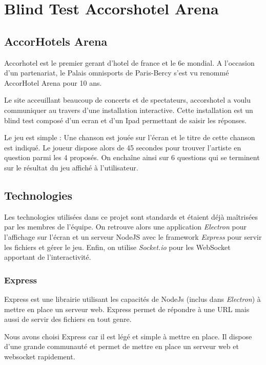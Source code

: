 \section{Blind Test Accorshotel Arena}

\subsection{AccorHotels Arena}

Accorhotel est le premier gerant d'hotel de france et le 6e mondial.
A l'occasion d'un partenariat, le Palais omnisports de Paris-Bercy s'est vu renommé AccorHotel Arena pour 10 ans.

Le site acceuillant beaucoup de concerts et de spectateurs, accorshotel a voulu communiquer au travers d'une installation interactive.
Cette installation est un blind test composé d'un ecran et d'un Ipad permettant de saisir les réponses.

Le jeu est simple : Une chanson est jouée sur l'écran et le titre de cette chanson est indiqué.
Le joueur dispose alors de 45 secondes pour trouver l'artiste en question parmi les 4 proposés.
On enchaîne ainsi sur 6 questions qui se terminent sur le résultat du jeu affiché à l'utilisateur.

\subsection{Technologies}

Les technologies utilisées dans ce projet sont standards et étaient déjà maîtrisées par les membres de l'équipe.
On retrouve alors une application \emph{Electron} pour l'affichage sur l'écran et un serveur NodeJS avec le framework \emph{Express} pour servir les fichiers et gérer le jeu.
Enfin, on utilise \emph{Socket.io} pour les WebSocket apportant de l'interactivité.

\subsubsection{Express}

Express est une librairie utilisant les capacités de NodeJs (inclus dans \emph{Electron}) à mettre en place un serveur web.
Express permet de répondre à une URL mais aussi de servir des fichiers en tout genre.

Nous avons choisi Express car il est légé et simple à mettre en place.
Il dispose d'une grande communauté et permet de mettre en place un serveur web et websocket rapidement.

